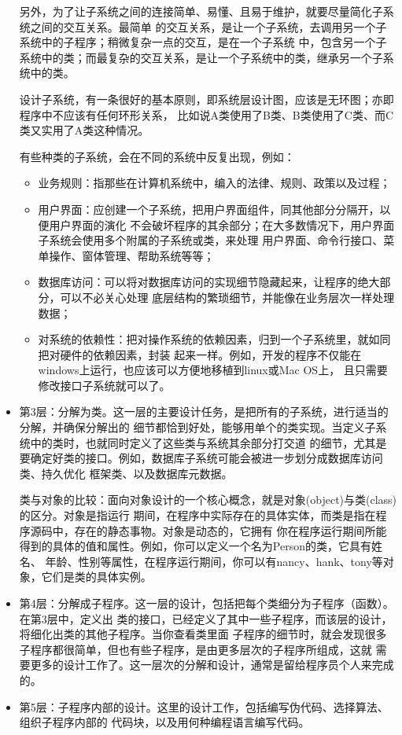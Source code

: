 \documentclass{article}
\begin{document}
\begin{itemize}
\begin{figure}[ht]
    \end{figure}
    另外，为了让子系统之间的连接简单、易懂、且易于维护，就要尽量简化子系统之间的交互关系。最简单
    的交互关系，是让一个子系统，去调用另一个子系统中的子程序；稍微复杂一点的交互，是在一个子系统
    中，包含另一个子系统中的类；而最复杂的交互关系，是让一个子系统中的类，继承另一个子系统中的类。
    \par
    设计子系统，有一条很好的基本原则，即系统层设计图，应该是无环图；亦即程序中不应该有任何环形关系，
    比如说A类使用了B类、B类使用了C类、而C类又实用了A类这种情况。
    \par
    有些种类的子系统，会在不同的系统中反复出现，例如：
    \begin{itemize}
        \item 业务规则：指那些在计算机系统中，编入的法律、规则、政策以及过程；
        \item 用户界面：应创建一个子系统，把用户界面组件，同其他部分分隔开，以便用户界面的演化
        不会破坏程序的其余部分；在大多数情况下，用户界面子系统会使用多个附属的子系统或类，来处理
        用户界面、命令行接口、菜单操作、窗体管理、帮助系统等等；
        \item 数据库访问：可以将对数据库访问的实现细节隐藏起来，让程序的绝大部分，可以不必关心处理
        底层结构的繁琐细节，并能像在业务层次一样处理数据；
        \item 对系统的依赖性：把对操作系统的依赖因素，归到一个子系统里，就如同把对硬件的依赖因素，封装
        起来一样。例如，开发的程序不仅能在windows上运行，也应该可以方便地移植到linux或Mac OS上，
        且只需要修改接口子系统就可以了。
    \end{itemize}
    \item 第3层：分解为类。这一层的主要设计任务，是把所有的子系统，进行适当的分解，并确保分解出的
    细节都恰到好处，能够用单个的类实现。当定义子系统中的类时，也就同时定义了这些类与系统其余部分打交道
    的细节，尤其是要确定好类的接口。例如，数据库子系统可能会被进一步划分成数据库访问类、持久优化
    框架类、以及数据库元数据。
    \par
    类与对象的比较：面向对象设计的一个核心概念，就是对象(object)与类(class)的区分。对象是指运行
    期间，在程序中实际存在的具体实体，而类是指在程序源码中，存在的静态事物。对象是动态的，它拥有
    你在程序运行期间所能得到的具体的值和属性。例如，你可以定义一个名为Person的类，它具有姓名、
    年龄、性别等属性，在程序运行期间，你可以有nancy、hank、tony等对象，它们是类的具体实例。
    \item 第4层：分解成子程序。这一层的设计，包括把每个类细分为子程序（函数）。在第3层中，定义出
    类的接口，已经定义了其中一些子程序，而该层的设计，将细化出类的其他子程序。当你查看类里面
    子程序的细节时，就会发现很多子程序都很简单，但也有些子程序，是由更多层次的子程序所组成，这就
    需要更多的设计工作了。这一层次的分解和设计，通常是留给程序员个人来完成的。
    \item 第5层：子程序内部的设计。这里的设计工作，包括编写伪代码、选择算法、组织子程序内部的
    代码块，以及用何种编程语言编写代码。
\end{itemize}
\end{document}
